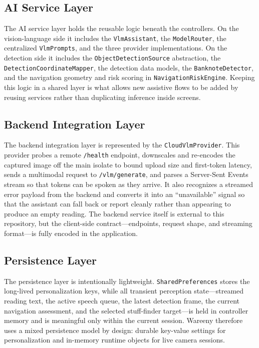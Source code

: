 \documentclass[a4paper]{report}
\begin{document}
\subsection{AI Service Layer}
The AI service layer holds the reusable logic beneath the controllers. On the vision-language side it includes the \texttt{VlmAssistant}, the \texttt{ModelRouter}, the centralized \texttt{VlmPrompts}, and the three provider implementations. On the detection side it includes the \texttt{ObjectDetectionSource} abstraction, the \texttt{DetectionCoordinateMapper}, the detection data models, the \texttt{BanknoteDetector}, and the navigation geometry and risk scoring in \texttt{NavigationRiskEngine}. Keeping this logic in a shared layer is what allows new assistive flows to be added by reusing services rather than duplicating inference inside screens.

\subsection{Backend Integration Layer}
The backend integration layer is represented by the \texttt{CloudVlmProvider}. This provider probes a remote \texttt{/health} endpoint, downscales and re-encodes the captured image off the main isolate to bound upload size and first-token latency, sends a multimodal request to \texttt{/vlm/generate}, and parses a Server-Sent Events stream so that tokens can be spoken as they arrive. It also recognizes a streamed error payload from the backend and converts it into an ``unavailable'' signal so that the assistant can fall back or report cleanly rather than appearing to produce an empty reading. The backend service itself is external to this repository, but the client-side contract---endpoints, request shape, and streaming format---is fully encoded in the application.

\subsection{Persistence Layer}
The persistence layer is intentionally lightweight. \texttt{SharedPreferences} stores the long-lived personalization keys, while all transient perception state---streamed reading text, the active speech queue, the latest detection frame, the current navigation assessment, and the selected stuff-finder target---is held in controller memory and is meaningful only within the current session. Wareeny therefore uses a mixed persistence model by design: durable key-value settings for personalization and in-memory runtime objects for live camera sessions.
\end{document}
